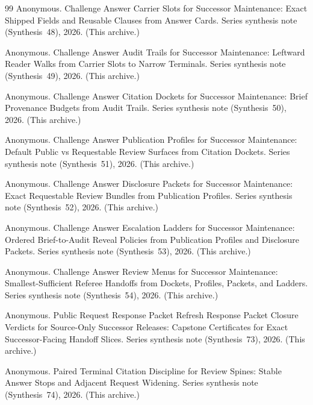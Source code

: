 \documentclass[11pt]{article}
\begin{document}
\begin{thebibliography}{99}
Anonymous.
\newblock Challenge Answer Carrier Slots for Successor Maintenance: Exact Shipped Fields and Reusable Clauses from Answer Cards.
\newblock Series synthesis note (Synthesis~48), 2026. (This archive.)

Anonymous.
\newblock Challenge Answer Audit Trails for Successor Maintenance: Leftward Reader Walks from Carrier Slots to Narrow Terminals.
\newblock Series synthesis note (Synthesis~49), 2026. (This archive.)

Anonymous.
\newblock Challenge Answer Citation Dockets for Successor Maintenance: Brief Provenance Budgets from Audit Trails.
\newblock Series synthesis note (Synthesis~50), 2026. (This archive.)

Anonymous.
\newblock Challenge Answer Publication Profiles for Successor Maintenance: Default Public vs Requestable Review Surfaces from Citation Dockets.
\newblock Series synthesis note (Synthesis~51), 2026. (This archive.)

Anonymous.
\newblock Challenge Answer Disclosure Packets for Successor Maintenance: Exact Requestable Review Bundles from Publication Profiles.
\newblock Series synthesis note (Synthesis~52), 2026. (This archive.)

Anonymous.
\newblock Challenge Answer Escalation Ladders for Successor Maintenance: Ordered Brief-to-Audit Reveal Policies from Publication Profiles and Disclosure Packets.
\newblock Series synthesis note (Synthesis~53), 2026. (This archive.)

Anonymous.
\newblock Challenge Answer Review Menus for Successor Maintenance: Smallest-Sufficient Referee Handoffs from Dockets, Profiles, Packets, and Ladders.
\newblock Series synthesis note (Synthesis~54), 2026. (This archive.)

Anonymous.
\newblock Public Request Response Packet Refresh Response Packet Closure Verdicts for Source-Only Successor Releases: Capstone Certificates for Exact Successor-Facing Handoff Slices.
\newblock Series synthesis note (Synthesis~73), 2026. (This archive.)

Anonymous.
\newblock Paired Terminal Citation Discipline for Review Spines: Stable Answer Stops and Adjacent Request Widening.
\newblock Series synthesis note (Synthesis~74), 2026. (This archive.)


\end{thebibliography}
\end{document}
